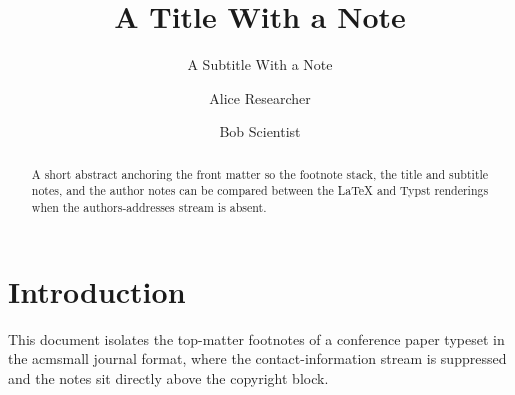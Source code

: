 \documentclass[acmsmall]{acmart}
\begin{document}
\title{A Title With a Note}
\subtitle{A Subtitle With a Note}

\author{Alice Researcher}

\author{Bob Scientist}
\correspondingauthor
{}

\renewcommand{\shortauthors}{Researcher and Scientist}

\begin{abstract}
  A short abstract anchoring the front matter so the footnote stack, the title
  and subtitle notes, and the author notes can be compared between the LaTeX and
  Typst renderings when the authors-addresses stream is absent.
\end{abstract}

\maketitle

\section{Introduction}
This document isolates the top-matter footnotes of a conference paper typeset in
the acmsmall journal format, where the contact-information stream is suppressed
and the notes sit directly above the copyright block.
\end{document}
